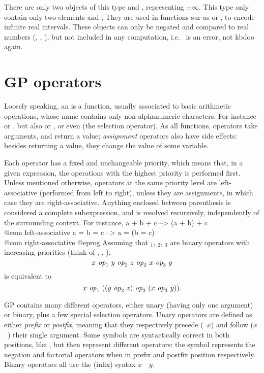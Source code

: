%

There are only two objects of this type  and , representing
$\pm\infty$. This type only contain only two elements  and ,
They are used in functions sur as  or , to
encode infinite real intervals. These objects can only be negated and
compared to real numbers (, , ), but not
included in any computation, i.e.~ is an error, not kbd{oo} again.

\section{GP operators}\label{se:operators}

\noindent Loosely speaking, an  is a function, usually
associated to basic arithmetic operations, whose name contains only
non-alphanumeric characters. For instance \kbd{+} or \kbd{-}, but also
\kbd{=} or \kbd{+=}, or even \kbd{[ ]} (the selection operator). As all
functions, operators take arguments, and return a value; \emph{assignment}
operators also have side effects: besides returning a value, they change the
value of some variable.

Each operator has a fixed and unchangeable priority, which means that, in
a given expression, the operations with the highest priority is performed
first. Unless mentioned otherwise, operators at the same priority level are
left-associative (performed from left to right), unless they are assignments,
in which case they are right-associative. Anything enclosed between
parenthesis is considered a complete subexpression, and is resolved
recursively, independently of the surrounding context. For instance,
\bprog
  a + b + c    -->   (a + b) + c     \\@com left-associative
  a = b = c    -->   a = (b = c)     \\@com right-associative
@eprog\noindent
Assuming that $_1$, $_2$, $_3$ are
binary operators with increasing priorities (think of \kbd{+},
\kbd{*}, \kbd{\pow}),
$$ x~\hbox{\it op\/}_1~y~\hbox{\it op\/}_2~z~\hbox{\it op\/}_2~x~\hbox{\it op\/}_3~y $$ is
equivalent to $$ x~\hbox{\it op\/}_1~((y~\hbox{\it op\/}_2~z)~\hbox{\it op\/}_2~
(x~\hbox{\it op\/}_3~y)).$$

GP contains many different operators, either unary (having only
one argument) or binary, plus a few special selection operators. Unary
operators are defined as either \emph{prefix}  or \emph{postfix}, meaning
that they respectively precede (~$x$) and follow ($x$~) their
single argument. Some symbols are syntactically correct in both positions,
like \kbd{!}, but then represent different operators: the \kbd{!} symbol
represents the negation and factorial operators when in prefix and postfix
position respectively. Binary operators all use the (infix) syntax
$x$~~$y$.


